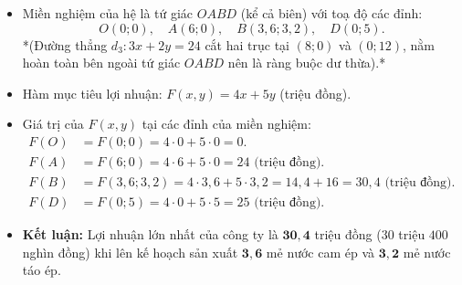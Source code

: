 \documentclass[12pt,a4paper]{article}
\begin{document}
\vspace{0.2cm}
\begin{itemize}[leftmargin=1.5em, itemsep=3pt]
    \item Miền nghiệm của hệ là tứ giác $OABD$ (kể cả biên) với toạ độ các đỉnh:
    \[
    O(0;0), \quad A(6;0), \quad B(3{,}6; 3{,}2), \quad D(0;5).
    \]
    *(Đường thẳng $d_3\colon 3x + 2y = 24$ cắt hai trục tại $(8; 0)$ và $(0; 12)$, nằm hoàn toàn bên ngoài tứ giác $OABD$ nên là ràng buộc dư thừa).*
    \item Hàm mục tiêu lợi nhuận: $F(x, y) = 4x + 5y$ (triệu đồng).
    \item Giá trị của $F(x, y)$ tại các đỉnh của miền nghiệm:
    \begin{align*}
    F(O) &= F(0; 0) = 4 \cdot 0 + 5 \cdot 0 = 0. \\
    F(A) &= F(6; 0) = 4 \cdot 6 + 5 \cdot 0 = 24\text{ (triệu đồng)}. \\
    F(B) &= F(3{,}6; 3{,}2) = 4 \cdot 3{,}6 + 5 \cdot 3{,}2 = 14{,}4 + 16 = 30{,}4\text{ (triệu đồng)}. \\
    F(D) &= F(0; 5) = 4 \cdot 0 + 5 \cdot 5 = 25\text{ (triệu đồng)}.
    \end{align*}
    \item \textbf{Kết luận:} Lợi nhuận lớn nhất của công ty là $\mathbf{30{,}4}$ triệu đồng ($30$ triệu $400$ nghìn đồng) khi lên kế hoạch sản xuất $\mathbf{3{,}6}$ mẻ nước cam ép và $\mathbf{3{,}2}$ mẻ nước táo ép.
\end{itemize}
\end{document}
